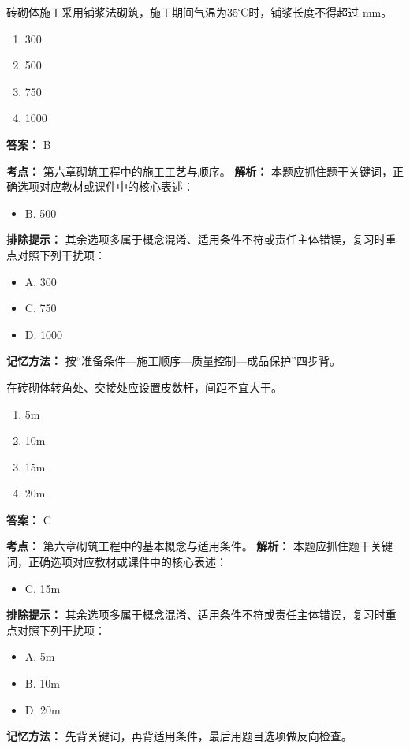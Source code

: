 \documentclass[UTF8,fontset=fandol,11pt]{ctexart}
\begin{document}
\begin{quizbox}[title={第 13 题}]
砖砌体施工采用铺浆法砌筑，施工期间气温为35℃时，铺浆长度不得超过 mm。\\
\begin{enumerate}[label=\Alph*.]
\item 300
\item 500
\item 750
\item 1000
\end{enumerate}
\textbf{答案：} B
\vspace{0.25em}
\begin{answerbox}[title={考点解析}]
\textbf{考点：} 第六章砌筑工程中的施工工艺与顺序。
\textbf{解析：} 本题应抓住题干关键词，正确选项对应教材或课件中的核心表述：
\begin{itemize}
\item B. 500
\end{itemize}
\textbf{排除提示：} 其余选项多属于概念混淆、适用条件不符或责任主体错误，复习时重点对照下列干扰项：
\begin{itemize}
\item A. 300
\item C. 750
\item D. 1000
\end{itemize}
\textbf{记忆方法：} 按“准备条件—施工顺序—质量控制—成品保护”四步背。
\end{answerbox}
\end{quizbox}

\begin{quizbox}[title={第 14 题}]
在砖砌体转角处、交接处应设置皮数杆，间距不宜大于。\\
\begin{enumerate}[label=\Alph*.]
\item 5m
\item 10m
\item 15m
\item 20m
\end{enumerate}
\textbf{答案：} C
\vspace{0.25em}
\begin{answerbox}[title={考点解析}]
\textbf{考点：} 第六章砌筑工程中的基本概念与适用条件。
\textbf{解析：} 本题应抓住题干关键词，正确选项对应教材或课件中的核心表述：
\begin{itemize}
\item C. 15m
\end{itemize}
\textbf{排除提示：} 其余选项多属于概念混淆、适用条件不符或责任主体错误，复习时重点对照下列干扰项：
\begin{itemize}
\item A. 5m
\item B. 10m
\item D. 20m
\end{itemize}
\textbf{记忆方法：} 先背关键词，再背适用条件，最后用题目选项做反向检查。
\end{answerbox}
\end{quizbox}
\end{document}
